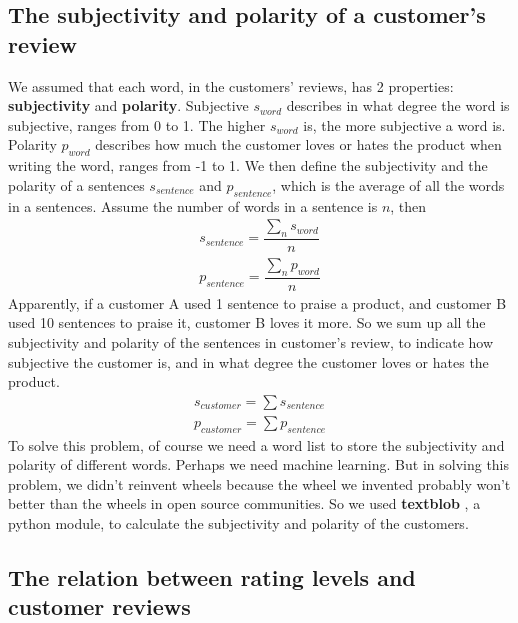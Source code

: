 \documentclass[12pt]{article}  %
\begin{document}
\subsection{The subjectivity and polarity of a customer's review}
We assumed that each word, in the customers' reviews, has 2 properties: \textbf{subjectivity} and \textbf{polarity}. Subjective $s_{word}$ describes in what degree the word is subjective, ranges from 0 to 1. The higher $s_{word}$ is, the more subjective a word is. Polarity $p_{word}$ describes how much the customer loves or hates the product when writing the word, ranges from -1 to 1. We then define the subjectivity and the polarity of a sentences $s_{sentence}$ and $p_{sentence}$, which is the average of all the words in a sentences. Assume the number of words in a sentence is $n$, then
\begin{equation*}
  \begin{aligned}
    s_{sentence} = \dfrac{\sum\limits_{n} s_{word}}{n}  \\
    p_{sentence} = \dfrac{\sum\limits_{n} p_{word}}{n} 
  \end{aligned}
\end{equation*}
Apparently, if a customer A used 1 sentence to praise a product, and customer B used 10 sentences to praise it, customer B loves it more. So we sum up all the subjectivity and polarity of the sentences in customer's review, to indicate how subjective the customer is, and in what degree the customer loves or hates the product.
\begin{equation*}
  \begin{aligned}
    s_{customer} = \sum s_{sentence} \\
    p_{customer} = \sum p_{sentence}
  \end{aligned}
\end{equation*}
To solve this problem, of course we need a word list to store the subjectivity and polarity of different words. Perhaps we need machine learning. But in solving this problem, we didn't reinvent wheels because the wheel we invented probably won't better than the wheels in open source communities. So we used \textbf{textblob} , a python module, to calculate the subjectivity and polarity of the customers.

\subsection{The relation between rating levels and customer reviews}
\end{document}
